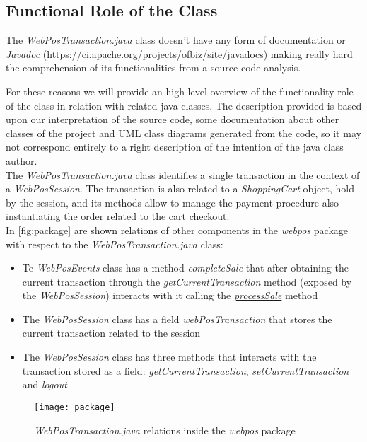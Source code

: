 \subsection{Functional Role of the Class}
The \emph{WebPosTransaction.java} class doesn't have any form of documentation or \emph{Javadoc} (\url{https://ci.apache.org/projects/ofbiz/site/javadocs}) making really hard the comprehension of its functionalities from a source code analysis.

For these reasons we will provide an high-level overview of the functionality role of the class in relation with related java classes. The description provided is based upon our interpretation of the source code, some documentation about other classes of the project and UML class diagrams generated from the code, so it may not correspond entirely to a right description of the intention of the java class author.\\

The \emph{WebPosTransaction.java} class identifies a single transaction in the context of a \emph{WebPosSession}. The transaction is also related to a \emph{ShoppingCart} object, hold by the session, and its methods allow to manage the payment procedure also instantiating the order related to the cart checkout. \\

In \autoref{fig:package} are shown relations of other components in the \emph{webpos} package with respect to the \emph{WebPosTransaction.java} class:
\begin{itemize}
	\item Te \emph{WebPosEvents} class has a method \emph{completeSale} that after obtaining the current transaction through the \emph{getCurrentTransaction} method (exposed by the \emph{WebPosSession}) interacts with it calling the \hyperref[method:processSale]{\emph{processSale}} method
	\item The \emph{WebPosSession} class has a field \emph{webPosTransaction} that stores the current transaction related to the session
	\item The \emph{WebPosSession} class has three methods that interacts with the transaction stored as a field: \emph{getCurrentTransaction}, \emph{setCurrentTransaction} and \emph{logout}
\end{itemize}

\begin{figure}[h]
			\centering
			\texttt{[image: package]}
			\caption{
				\label{fig:package} 
				\emph{WebPosTransaction.java} relations inside the \emph{webpos} package
			}
		\end{figure}

